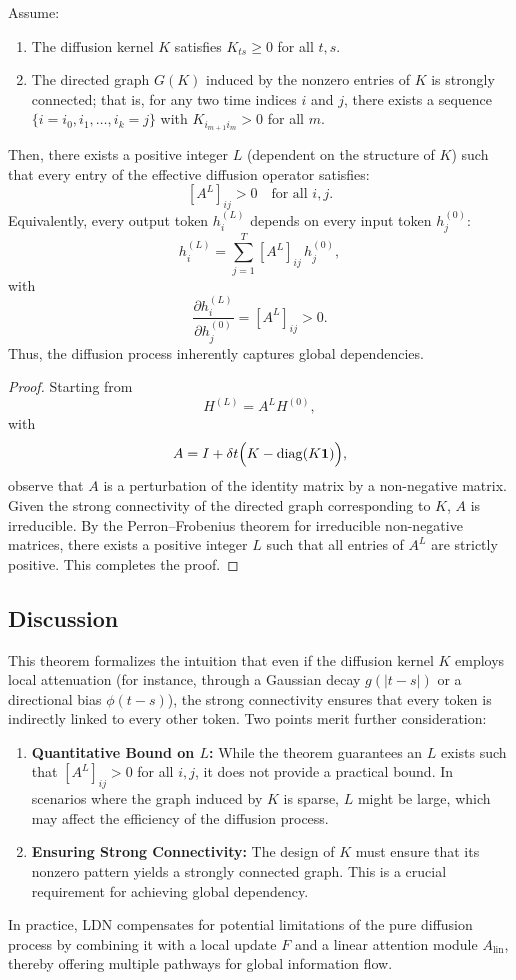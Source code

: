 \begin{theorem}
Assume:
\begin{enumerate}
    \item The diffusion kernel \(K\) satisfies \(K_{ts} \geq 0\) for all \(t,s\).
    \item The directed graph \(G(K)\) induced by the nonzero entries of \(K\) is strongly connected; that is, for any two time indices \(i\) and \(j\), there exists a sequence \(\{i = i_0, i_1, \dots, i_k = j\}\) with \(K_{i_{m+1} i_m} > 0\) for all \(m\).
\end{enumerate}
Then, there exists a positive integer \(L\) (dependent on the structure of \(K\)) such that every entry of the effective diffusion operator satisfies:
\[
[A^L]_{ij} > 0 \quad \text{for all } i,j.
\]
Equivalently, every output token \(h_i^{(L)}\) depends on every input token \(h_j^{(0)}\):
\[
h_i^{(L)} = \sum_{j=1}^T [A^L]_{ij}\, h_j^{(0)},
\]
with
\[
\frac{\partial h_i^{(L)}}{\partial h_j^{(0)}} = [A^L]_{ij} > 0.
\]
Thus, the diffusion process inherently captures global dependencies.
\end{theorem}

\begin{proof}
Starting from
\[
H^{(L)} = A^L H^{(0)},
\]
with
\[
A = I + \delta t \Bigl(K - \operatorname{diag}(K \mathbf{1})\Bigr),
\]
observe that \(A\) is a perturbation of the identity matrix by a non-negative matrix. Given the strong connectivity of the directed graph corresponding to \(K\), \(A\) is irreducible. By the Perron–Frobenius theorem for irreducible non-negative matrices, there exists a positive integer \(L\) such that all entries of \(A^L\) are strictly positive. This completes the proof.
\end{proof}

\subsection{Discussion}
This theorem formalizes the intuition that even if the diffusion kernel \(K\) employs local attenuation (for instance, through a Gaussian decay \(g(|t-s|)\) or a directional bias \(\phi(t-s)\)), the strong connectivity ensures that every token is indirectly linked to every other token. Two points merit further consideration:
\begin{enumerate}
    \item \textbf{Quantitative Bound on \(L\):} While the theorem guarantees an \(L\) exists such that \([A^L]_{ij} > 0\) for all \(i,j\), it does not provide a practical bound. In scenarios where the graph induced by \(K\) is sparse, \(L\) might be large, which may affect the efficiency of the diffusion process.
    \item \textbf{Ensuring Strong Connectivity:} The design of \(K\) must ensure that its nonzero pattern yields a strongly connected graph. This is a crucial requirement for achieving global dependency.
\end{enumerate}
In practice, LDN compensates for potential limitations of the pure diffusion process by combining it with a local update \(F\) and a linear attention module \(A_{\text{lin}}\), thereby offering multiple pathways for global information flow.


